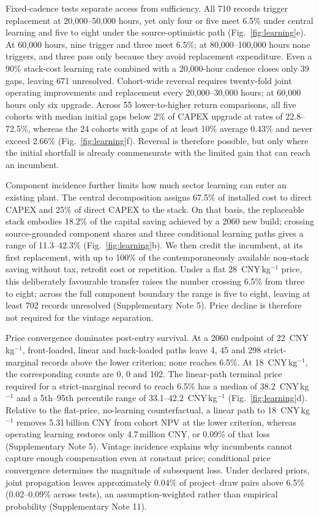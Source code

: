\documentclass[pdflatex,sn-nature]{sn-jnl}
\newcommand{\cnykg}{CNY\,kg$^{-1}$}
\begin{document}
Fixed-cadence tests separate access from sufficiency. All 710 records trigger replacement at 20,000--50,000 hours, yet only four or five meet 6.5\% under central learning and five to eight under the source-optimistic path (Fig.~\ref{fig:learning}e). At 60,000 hours, nine trigger and three meet 6.5\%; at 80,000--100,000 hours none triggers, and three pass only because they avoid replacement expenditure. Even a 90\% stack-cost learning rate combined with a 20,000-hour cadence closes only 39 gaps, leaving 671 unresolved. Cohort-wide reversal requires twenty-fold joint operating improvements and replacement every 20,000--30,000 hours; at 60,000 hours only six upgrade. Across 55 lower-to-higher return comparisons, all five cohorts with median initial gaps below 2\% of CAPEX upgrade at rates of 22.8--72.5\%, whereas the 24 cohorts with gaps of at least 10\% average 0.43\% and never exceed 2.66\% (Fig.~\ref{fig:learning}f). Reversal is therefore possible, but only where the initial shortfall is already commensurate with the limited gain that can reach an incumbent.

Component incidence further limits how much sector learning can enter an existing plant. The central decomposition assigns 67.5\% of installed cost to direct CAPEX and 25\% of direct CAPEX to the stack. On that basis, the replaceable stack embodies 18.2\% of the capital saving achieved by a 2060 new build; crossing source-grounded component shares and three conditional learning paths gives a range of 11.3--42.3\% (Fig.~\ref{fig:learning}b). We then credit the incumbent, at its first replacement, with up to 100\% of the contemporaneously available non-stack saving without tax, retrofit cost or repetition. Under a flat 28~\cnykg{} price, this deliberately favourable transfer raises the number crossing 6.5\% from three to eight; across the full component boundary the range is five to eight, leaving at least 702 records unresolved (Supplementary Note 5). Price decline is therefore not required for the vintage separation.

Price convergence dominates post-entry survival. At a 2060 endpoint of 22~\cnykg{}, front-loaded, linear and back-loaded paths leave 4, 45 and 298 strict-marginal records above the lower criterion; none reaches 6.5\%. At 18~\cnykg{}, the corresponding counts are 0, 0 and 102. The linear-path terminal price required for a strict-marginal record to reach 6.5\% has a median of 38.2~\cnykg{} and a 5th--95th percentile range of 33.1--42.2~\cnykg{} (Fig.~\ref{fig:learning}d). Relative to the flat-price, no-learning counterfactual, a linear path to 18~\cnykg{} removes 5.31\,billion CNY from cohort NPV at the lower criterion, whereas operating learning restores only 4.7\,million CNY, or 0.09\% of that loss (Supplementary Note 5). Vintage incidence explains why incumbents cannot capture enough compensation even at constant price; conditional price convergence determines the magnitude of subsequent loss. Under declared priors, joint propagation leaves approximately 0.04\% of project--draw pairs above 6.5\% (0.02--0.09\% across tests), an assumption-weighted rather than empirical probability (Supplementary Note 11).
\end{document}
